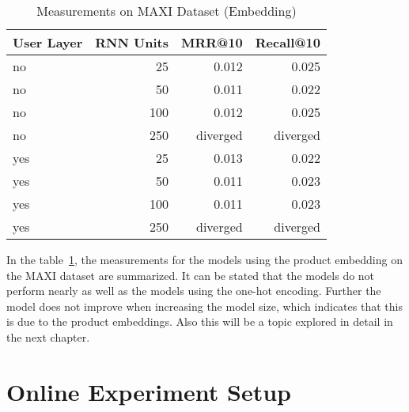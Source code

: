 \begin{table}[t]
    \centering
    \begin{tabular}{lrrr}\toprule
        \textbf{User Layer} & \textbf{RNN Units} & \textbf{MRR@10} & \textbf{Recall@10} \\ \midrule
        no & 25 & 0.012 & 0.025 \\ 
        no & 50 & 0.011 & 0.022 \\ 
        no & 100 & 0.012 & 0.025 \\ 
        no & 250 & diverged & diverged \\ \midrule
        yes & 25 & 0.013 & 0.022 \\ 
        yes & 50 & 0.011 & 0.023 \\ 
        yes & 100 & 0.011 & 0.023 \\ 
        yes & 250 & diverged & diverged \\ \bottomrule
    \end{tabular}
    \caption{Measurements on MAXI Dataset (Embedding)}
    \label{tab:maxi_dataset_measurements_embedding}
\end{table}
In the table~\ref{tab:maxi_dataset_measurements_embedding}, the measurements for the models using the product embedding on the MAXI dataset are summarized.
It can be stated that the models do not perform nearly as well as the models using the one-hot encoding.
Further the model does not improve when increasing the model size, which indicates that this is due to the product embeddings.
Also this will be a topic explored in detail in the next chapter.
\section{Online Experiment Setup}
